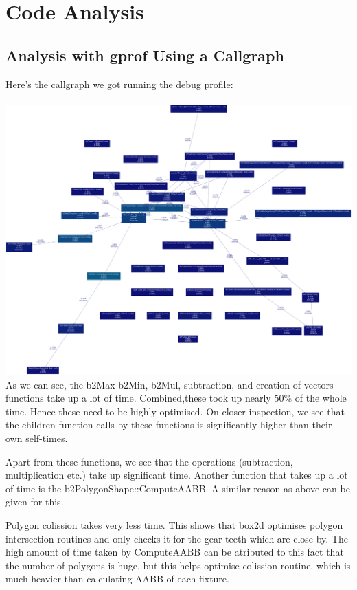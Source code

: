 \documentclass[12pt]{article}
\begin{document}
\section{Code Analysis}
\subsection{Analysis with gprof Using a Callgraph}
Here's the callgraph we got running the debug profile:
\\ \\
\includegraphics[scale=0.15]{./img/callgraph.png}
\\
As we can see, the b2Max b2Min, b2Mul, subtraction, and creation of vectors functions take up a lot of time. Combined,these took up nearly 50\% of the whole time. Hence these need to be highly optimised. On closer inspection, we see that the children function calls by these functions is significantly higher than their own self-times. 

Apart from these functions, we see that the operations (subtraction, multiplication etc.) take up significant time.   Another function that takes up a lot of time is the b2PolygonShape::ComputeAABB. A similar reason as above can be given for this.

Polygon colission takes very less time. This shows that box2d optimises polygon intersection routines and only checks it for the gear teeth which are close by. The high amount of time taken by ComputeAABB can be atributed to this fact that the number of polygons is huge, but this helps optimise colission routine, which is much heavier than calculating AABB of each fixture.
\end{document}
